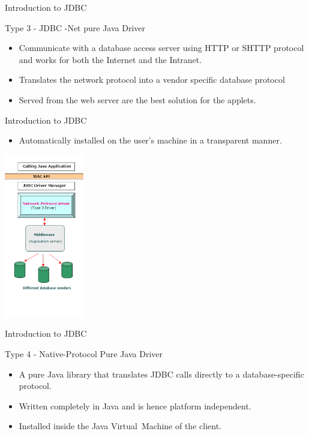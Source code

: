 \documentclass[14pt]{beamer}
\begin{document}
\begin{frame}{Introduction to JDBC}
\begin{block}{}
  Type 3 -  JDBC -Net pure Java Driver
\end{block}
\begin{itemize}
\item Communicate with a database access server using HTTP or SHTTP protocol and works for both the Internet and the Intranet.
\item Translates the network protocol into a vendor specific database protocol
\item Served from the web server are the best solution for the applets.
\end{itemize}
\end{frame}

\begin{frame}{Introduction to JDBC}
\begin{itemize}
\item Automatically installed on the user’s machine in a transparent manner.
\end{itemize}
\begin{center}
    \includegraphics[scale=0.5]{JEE-M03-S01-Image4.png}
  \end{center}
\end{frame}

\begin{frame}{Introduction to JDBC}
\begin{block}{}
  Type 4 -  Native-Protocol Pure Java Driver
\end{block}
\begin{itemize}
\item A pure Java library that translates JDBC calls directly to a database-specific protocol.
\item Written completely in Java and is hence platform independent.
\item Installed inside the Java Virtual Machine of the client.
\end{itemize}
\end{frame}
\end{document}
